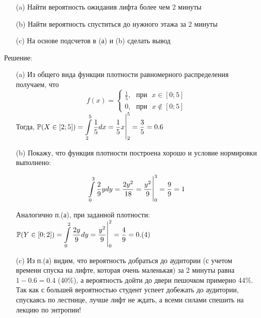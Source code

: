 \documentclass[a4paper,11pt]{article}
\begin{document}
	\begin{enumerate}
		\item [(a)] Найти вероятность ожидания лифта более чем 2 минуты
		\item [(b)] Найти вероятность спуститься до нужного этажа за 2 минуты
		\item [(c)] На основе подсчетов в (а) и (b) сделать вывод
	\end{enumerate}

	\begin{center}
		{\large Решение:}
	\end{center}

	\begin{enumerate}
		\item [(a)] 
		Из общего вида функции плотности равномерного распределения получаем, что
		\[
		f(x) = 	\begin{cases}
		\frac{1}{5}, \text{ } \text{при} \text{ } x\in[0;5] \\ 
		0, \text{ } \text{при} \text{ } x\notin[0;5]
		\end{cases} 
		\]
		Тогда, $ \mathbb{P}(X\in[2;5]) =  \Large \displaystyle \int\limits_{2}^{5}\dfrac{1}{5}dx = \dfrac{1}{5}x\bigg|^{5}_{2}=\dfrac{3}{5}=0.6$
		
		\item [(b)] Покажу, что функция плотности построена хорошо и условие нормировки выполнено: 
		
		\[ 
		\Large \displaystyle \int\limits_{0}^{3}\dfrac{2}{9}ydy = \dfrac{2y^2}{18}=\dfrac{y^2}{9}\bigg|_{0}^{3}=\dfrac{9}{9}=1
		\]
		
		Аналогично п.(а), при заданной плотности: $ \mathbb{P}(Y\in[0;2]) = \Large \displaystyle \int\limits_{0}^{2}\dfrac{2y}{9}dy = \dfrac{y^2}{9}\bigg|_{0}^{2}=\dfrac{4}{9}=0.(4)$
		
		\item [(c)] Из п.(а) видим, что вероятность добраться до аудитории (с учетом времени спуска на лифте, которая очень маленькая) за 2 минуты равна $ 1 - 0.6 = 0.4 $ (40\%), а вероятность дойти до двери пешочком примерно 44\%. Так как с большей вероятностью студент успеет добежать до аудитории, спускаясь по лестнице, лучше лифт не ждать, а всеми силами спешить на лекцию по энтропии! 
	\end{enumerate}
\end{document}
